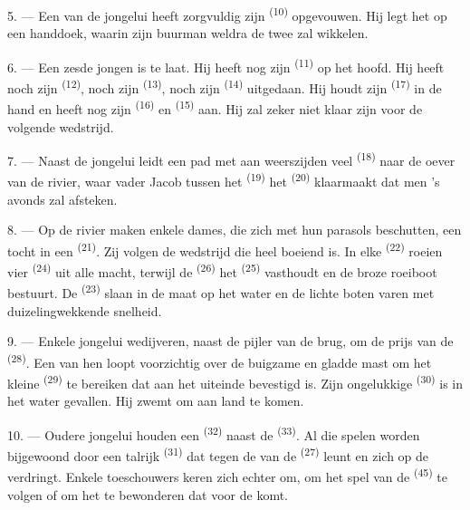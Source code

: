 5. --- Een van de jongelui heeft zorgvuldig zijn  \textsuperscript{(10)}
opgevouwen. Hij legt het op een handdoek, waarin zijn buurman weldra de twee
 zal wikkelen.

6. --- Een zesde jongen is te laat. Hij heeft nog zijn  \textsuperscript{(11)} op
het hoofd. Hij heeft noch zijn  \textsuperscript{(12)}, noch zijn 
\textsuperscript{(13)}, noch zijn  \textsuperscript{(14)} uitgedaan. Hij
houdt zijn
 \textsuperscript{(17)} in de hand en heeft nog zijn
 \textsuperscript{(16)} en 
\textsuperscript{(15)} aan. Hij zal zeker niet klaar zijn voor de volgende wedstrijd.

7. --- Naast de jongelui leidt een pad met aan weerszijden veel
 \textsuperscript{(18)} naar de oever van de rivier, waar vader
Jacob tussen het  \textsuperscript{(19)} het 
\textsuperscript{(20)} klaarmaakt dat men 's avonds zal afsteken.

\VUsaut{4.4mm}
\VUsaut{3.4mm}

8. --- Op de rivier maken enkele dames, die zich met hun parasols beschutten, een tocht in een
 \textsuperscript{(21)}. Zij volgen de wedstrijd die heel boeiend is. In elke
 \textsuperscript{(22)} roeien vier
 \textsuperscript{(24)} uit alle macht, terwijl de
 \textsuperscript{(26)} het 
\textsuperscript{(25)} vasthoudt en de broze roeiboot bestuurt. De
 \textsuperscript{(23)} slaan in de maat op het water en de
lichte boten varen met duizelingwekkende snelheid.

9. --- Enkele jongelui wedijveren, naast de pijler van de brug, om de prijs van de
 \textsuperscript{(28)}. Een van hen loopt voorzichtig over de buigzame en
gladde mast om het kleine  \textsuperscript{(29)} te bereiken dat aan het
uiteinde bevestigd is. Zijn ongelukkige  \textsuperscript{(30)} is in het
water gevallen. Hij zwemt om aan land te komen.

10. --- Oudere jongelui houden een  \textsuperscript{(32)} naast
de  \textsuperscript{(33)}. Al die spelen worden bijgewoond door een talrijk
 \textsuperscript{(31)} dat tegen de  van de 
\textsuperscript{(27)} leunt en zich op de  verdringt. Enkele toeschouwers keren
zich echter om, om het spel van de  \textsuperscript{(45)} te volgen of om
het  te bewonderen dat voor de  komt.

